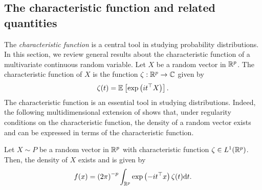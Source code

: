 \subsection{The characteristic function and related quantities} \label{sec-charfun}

The \textit{characteristic function} is a central tool in studying probability distributions. In this section, we review general results about the characteristic function of a multivariate continuous random variable. Let $X$ be a random vector in $\Rp$. The characteristic function of $X$ is the function $\zeta : \Rp \rightarrow \C$ given by
\begin{equation*}
    \zeta(t) = \expec{}{\expf{it^\top X}}.
\end{equation*}
The characteristic function is an essential tool in studying distributions. Indeed, the following multidimensional extension of \cite[Theorem 2.4.2]{kolassa2006series} shows that, under regularity conditions on the characteristic function, the density of a random vector exists and can be expressed in terms of the characteristic function.

\begin{theorem} \label{thm-char-inversion}
    Let $X \sim P$ be a random vector in $\Rp$ with characteristic function $\zeta \in L^1(\Rp)$. Then, the density of $X$ exists and is given by
    \begin{equation} \label{eq-density-via-charfun}
        f(x) = \left(2\pi\right)^{-p} \intRp{t}{ \expf{-it^\top x}\zeta(t) }.
    \end{equation}
\end{theorem}

